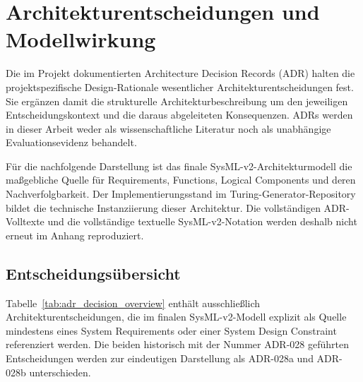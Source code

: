 \section{Architekturentscheidungen und Modellwirkung}
\label{app:architecture_decision_records}

Die im Projekt dokumentierten Architecture Decision Records (ADR) halten die
projektspezifische Design-Rationale wesentlicher Architekturentscheidungen fest.
Sie ergänzen damit die strukturelle Architekturbeschreibung um den jeweiligen
Entscheidungskontext und die daraus abgeleiteten Konsequenzen. ADRs werden in
dieser Arbeit weder als wissenschaftliche Literatur noch als unabhängige
Evaluationsevidenz behandelt.

Für die nachfolgende Darstellung ist das finale SysML-v2-Architekturmodell die
maßgebliche Quelle für Requirements, Functions, Logical Components und deren
Nachverfolgbarkeit. Der Implementierungsstand im Turing-Generator-Repository
bildet die technische Instanziierung dieser Architektur. Die vollständigen
ADR-Volltexte und die vollständige textuelle SysML-v2-Notation werden deshalb
nicht erneut im Anhang reproduziert.

\subsection{Entscheidungsübersicht}
\label{app:adr_decision_overview}

Tabelle~\ref{tab:adr_decision_overview} enthält ausschließlich
Architekturentscheidungen, die im finalen SysML-v2-Modell explizit als Quelle
mindestens eines System Requirements oder einer System Design Constraint
referenziert werden. Die beiden historisch mit der Nummer ADR-028 geführten
Entscheidungen werden zur eindeutigen Darstellung als ADR-028a und ADR-028b
unterschieden.

